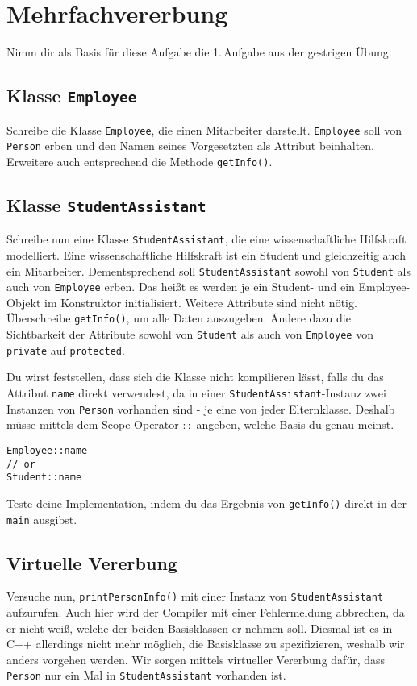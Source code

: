 \section{Mehrfachvererbung}
Nimm dir als Basis für diese Aufgabe die 1.\,Aufgabe aus der gestrigen Übung.

\subsection{Klasse \texttt{Employee}}
Schreibe die Klasse \texttt{Employee}, die einen Mitarbeiter darstellt.
\texttt{Employee} soll von \texttt{Person} erben und den Namen seines Vorgesetzten als Attribut beinhalten.
Erweitere auch entsprechend die Methode \texttt{getInfo()}.

\subsection{Klasse \texttt{StudentAssistant}}
Schreibe nun eine Klasse \texttt{StudentAssistant}, die eine wissenschaftliche Hilfskraft modelliert.
Eine wissenschaftliche Hilfskraft ist ein Student und gleichzeitig auch ein Mitarbeiter.
Dementsprechend soll \texttt{StudentAssistant} sowohl von \texttt{Student} als auch von \texttt{Employee} erben. Das heißt es werden je ein Student- und ein Employee-Objekt im Konstruktor initialisiert.
Weitere Attribute sind nicht nötig.
Überschreibe \texttt{getInfo()}, um alle Daten auszugeben.
Ändere dazu die Sichtbarkeit der Attribute sowohl von \texttt{Student} als auch von \texttt{Employee} von \texttt{private} auf \texttt{protected}.

Du wirst feststellen, dass sich die Klasse nicht kompilieren lässt, falls du das Attribut \texttt{name} direkt verwendest, da in einer \texttt{StudentAssistant}-Instanz zwei Instanzen von \texttt{Person} vorhanden sind - je eine von jeder Elternklasse. Deshalb müsse mittels dem Scope-Operator $::$ angeben, welche Basis du genau meinst.
\begin{lstlisting}
Employee::name
// or
Student::name
\end{lstlisting}

Teste deine Implementation, indem du das Ergebnis von \texttt{getInfo()} direkt in der \texttt{main} ausgibst.

\subsection{Virtuelle Vererbung}
Versuche nun, \texttt{printPersonInfo()} mit einer Instanz von \texttt{StudentAssistant} aufzurufen. Auch hier wird der Compiler mit einer Fehlermeldung abbrechen, da er nicht weiß, welche der beiden Basisklassen er nehmen soll.
Diesmal ist es in C++ allerdings nicht mehr möglich, die Basisklasse zu spezifizieren, weshalb wir anders vorgehen werden.
Wir sorgen mittels virtueller Vererbung dafür, dass \texttt{Person} nur ein Mal in \texttt{StudentAssistant} vorhanden ist.

